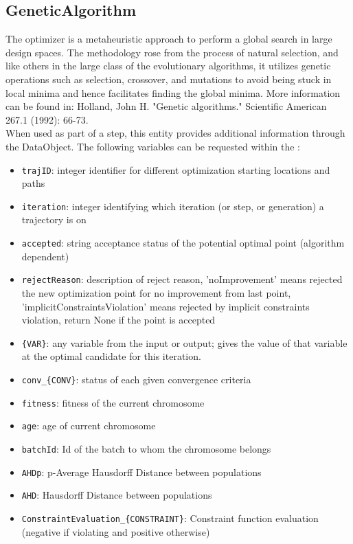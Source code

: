 \subsection{GeneticAlgorithm}
  The  optimizer is a metaheuristic approach
  to perform a global search in large design spaces. The methodology rose
  from the process of natural selection, and like others in the large class
  of the evolutionary algorithms, it utilizes genetic operations such as
  selection, crossover, and mutations to avoid being stuck in local minima
  and hence facilitates finding the global minima. More information can
  be found in:                             Holland, John H. "Genetic algorithms." Scientific
  American 267.1 (1992): 66-73.
\vspace{7pt} \\When used as part of a  step, this entity provides
        additional information through the  DataObject. The
        following variables can be requested within the :
        \begin{itemize}
          \item \texttt{trajID}: integer identifier for different optimization starting locations and paths
             \item \texttt{iteration}: integer identifying which iteration (or step, or generation) a trajectory is on
             \item \texttt{accepted}: string acceptance status of the potential optimal point (algorithm dependent)
             \item \texttt{rejectReason}: description of reject reason, 'noImprovement' means rejected the new optimization point for no improvement from last point, 'implicitConstraintsViolation' means rejected by implicit constraints violation, return None if the point is accepted
             \item \texttt{\{VAR\}}: any variable from the  input or output; gives the value of that variable at the optimal candidate for this iteration.
             \item \texttt{conv\_\{CONV\}}: status of each given convergence criteria
             \item \texttt{fitness}: fitness of the current chromosome
             \item \texttt{age}: age of current chromosome
             \item \texttt{batchId}: Id of the batch to whom the chromosome belongs
             \item \texttt{AHDp}: p-Average Hausdorff Distance between populations
             \item \texttt{AHD}: Hausdorff Distance between populations
             \item \texttt{ConstraintEvaluation\_\{CONSTRAINT\}}: Constraint function evaluation (negative if violating and positive otherwise)
           
         \end{itemize}

